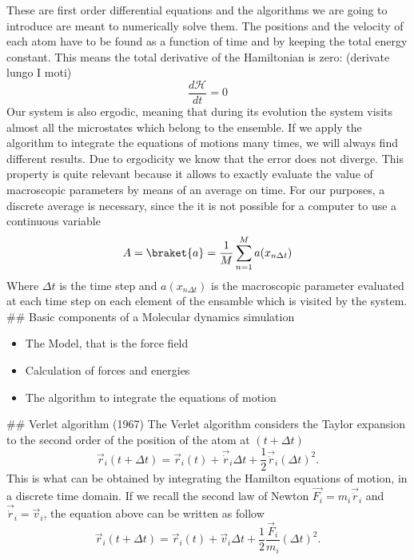 These are first order differential equations and the algorithms we are going to introduce are meant to numerically solve them. The positions and the velocity of each atom have to be found as a function of time and by keeping the total energy constant. This means the total derivative of the Hamiltonian is zero: (derivate lungo I moti)
\begin{equation}
\frac{d \mathcal{H}}{dt} = 0 
\end{equation}
Our system is also ergodic, meaning that during its evolution the system visits almost all the microstates which belong to the ensemble. If we apply the algorithm to integrate the equations of motions many times, we will always find different results. Due to ergodicity we know that the error does not diverge. This property is quite relevant because it allows to exactly evaluate the value of macroscopic parameters by means of an average on time. For our purposes, a discrete average is necessary, since the it is not possible for a computer to use a continuous variable
\begin{equation}
A = \braket{a} = \frac{1}{M}\sum_{n=1}^{M} a(x_{n \Delta t})
\end{equation} 
Where $\Delta t$ is the time step and $ a(x_{n \Delta t})$ is the macroscopic parameter evaluated at each time step on each element of the ensamble which is visited by the system.
\su## Basic components of a Molecular dynamics simulation
\begin{itemize}
\item The Model, that is the force field
\item Calculation of forces and energies
\item The algorithm to integrate the equations of motion
\end{itemize}
\su## Verlet algorithm (1967)
The Verlet algorithm considers the Taylor expansion to the second order of the position of the atom at $(t+ \Delta t)$
\begin{equation}
\vec{r}_{i} (t+ \Delta t) = \vec{r}_{i}(t) + \vec{\dot{r}}_{i} \Delta t + \frac{1}{2}\vec{\ddot{r}}_{i}(\Delta t)^{2}.
\end{equation}
This is what can be obtained by integrating the Hamilton equations of motion, in a discrete time domain.
If we recall the second law of Newton $\vec{F_{i}} = m_{i} \vec{\ddot{r}}_{i}$ and $\vec{\dot{r}}_{i}  = \vec{v}_{i}$, the equation above can be written as follow
\begin{equation} \label{\Delta t}
\vec{r}_{i} (t+ \Delta t) = \vec{r}_{i}(t) + \vec{v}_{i} \Delta t + \frac{1}{2}\frac{\vec{F}_{i}}{m_{i}}(\Delta t)^{2}.
\end{equation}
